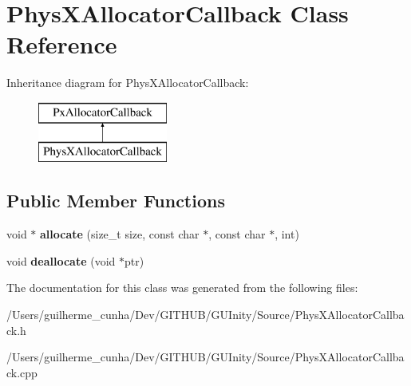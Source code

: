 \hypertarget{class_phys_x_allocator_callback}{}\section{Phys\+X\+Allocator\+Callback Class Reference}
\label{class_phys_x_allocator_callback}
Inheritance diagram for Phys\+X\+Allocator\+Callback\+:\begin{figure}[H]
\begin{center}
\leavevmode
\includegraphics[height=2.000000cm]{class_phys_x_allocator_callback}
\end{center}
\end{figure}
\subsection*{Public Member Functions}
\begin{DoxyCompactItemize}
\item 
\hypertarget{class_phys_x_allocator_callback_a5757eeeebbb1467b08436a6c38fdd642}{}void $\ast$ {\bfseries allocate} (size\+\_\+t size, const char $\ast$, const char $\ast$, int)\label{class_phys_x_allocator_callback_a5757eeeebbb1467b08436a6c38fdd642}

\item 
\hypertarget{class_phys_x_allocator_callback_a1043ba91a80459c8d6bfd4df345d8b1b}{}void {\bfseries deallocate} (void $\ast$ptr)\label{class_phys_x_allocator_callback_a1043ba91a80459c8d6bfd4df345d8b1b}

\end{DoxyCompactItemize}


The documentation for this class was generated from the following files\+:\begin{DoxyCompactItemize}
\item 
/\+Users/guilherme\+\_\+cunha/\+Dev/\+G\+I\+T\+H\+U\+B/\+G\+U\+Inity/\+Source/Phys\+X\+Allocator\+Callback.\+h\item 
/\+Users/guilherme\+\_\+cunha/\+Dev/\+G\+I\+T\+H\+U\+B/\+G\+U\+Inity/\+Source/Phys\+X\+Allocator\+Callback.\+cpp\end{DoxyCompactItemize}

